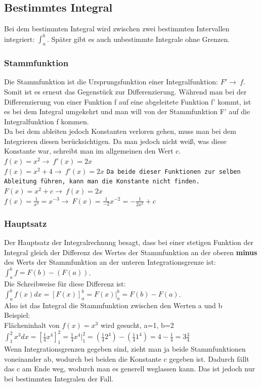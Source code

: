 \documentclass{article}
\begin{document}
	\subsection{Bestimmtes Integral}
	Bei dem bestimmten Integral wird zwischen zwei bestimmten Intervallen integriert: $\int_{a}^{b}$. Später gibt es auch unbestimmte Integrale ohne Grenzen. \\
	\subsubsection{Stammfunktion}
	Die Stammfunktion ist die Ursprungsfunktion einer Integralfunktion: $F'\to\ f$. Somit ist es erneut das Gegenstück zur Differenzierung. Während man bei der Differenzierung von einer Funktion f auf eine abgeleitete Funktion f' kommt, ist es bei dem Integral umgekehrt und man will von der Stammfunktion F' auf die Integralfunktion f kommen. \\
	Da bei dem ableiten jedoch Konstanten verloren gehen, muss man bei dem Integrieren diesen berücksichtigen. Da man jedoch nicht weiß, was diese Konstante war, schreibt man im allgemeinen den Wert c. \\
	$f(x)=x^2\to\ f'(x)=2x$ \\
	$f(x)=x^2+4\to\ f'(x)=2x$ \verb|Da beide dieser Funktionen zur selben Ableitung führen, kann man die Konstante nicht finden.|\\
	$F(x)=x^2+c\to\ f(x)=2x$ \\
	$f(x)=\frac{1}{x^3}=x^{-3}\to\ F(x)=\frac{1}{-2}x^{-2}=-\frac{1}{2x^2}+c$ \\
	\subsubsection{Hauptsatz}
	Der Hauptsatz der Integralrechnung besagt, dass bei einer stetigen Funktion der Integral gleich der Differenz des Wertes der Stammfunktion an der oberen \textbf{minus} des Werts der Stammfunktion an der unteren Integrationsgrenze ist: $\int_{a}^{b}f=F(b)-(F(a))$. \\
	Die Schreibweise für diese Differenz ist: $\int_{a}^{b}f(x)dx=[F(x)]^b_a=F(x)|^b_a=F(b)-F(a)$. \\
	Also ist das Integral die Stammfunktion zwischen den Werten a und b \\
	Beispiel: \\
	Flächeninhalt von $f(x)=x^3$ wird gesucht, a=1, b=2 \\
	$\int_{1}^{2}x^3dx=[\frac{1}{4}x^4]^2_1=\frac{1}{4}x^4|^2_1=(\frac{1}{4}2^4)-(\frac{1}{4}1^4)=4-\frac{1}{4}=3\frac{3}{4}$ \\
	Wenn Integrationsgrenzen gegeben sind, zieht man ja beide Stammfunktionen voneinander ab, wodurch bei beiden die Konstante c gegeben ist. Dadurch fällt das c am Ende weg, wodurch man es generell weglassen kann. Das ist jedoch nur bei bestimmten Integralen der Fall.
\end{document}
